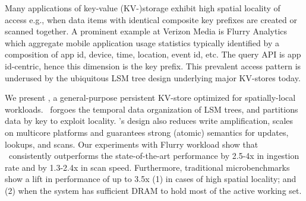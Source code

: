 Many applications of key-value (KV-)storage exhibit high spatial locality
of access e.g., when data items with identical composite key prefixes are created or scanned together.
A prominent example at Verizon Media is Flurry Analytics which aggregate mobile application usage statistics typically 
identified by a composition of app id, device, time, location, event id, etc. The query API is app id-centric, hence this dimension is the key prefix.
This prevalent access pattern is underused by the ubiquitous LSM tree design underlying major KV-stores today.

We present \sys, a general-purpose persistent KV-store optimized for spatially-local workloads.
\sys\ forgoes the temporal data organization of LSM trees, and partitions data by key to exploit locality.
\sys's design also reduces write amplification, scales on multicore platforms and guarantees strong (atomic) semantics for updates, lookups, and scans. 
Our experiments with Flurry workload show that \sys\ consistently outperforms the state-of-the-art performance by 2.5-4x in ingestion rate and by 1.3-2.4x in scan speed.
Furthermore, traditional microbenchmarks show a lift in performance of up to 3.5x (1) in cases of high spatial locality; and (2) when the system has sufficient DRAM
to hold most of the active working set.


